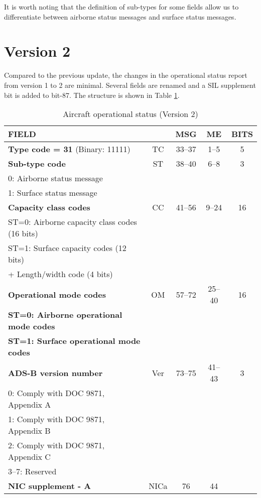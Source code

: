 It is worth noting that the definition of sub-types for some fields allow us to differentiate between airborne status messages and surface status messages.


\section{Version 2}

Compared to the previous update, the changes in the operational status report from version 1 to 2 are minimal. Several fields are renamed and a SIL supplement bit is added to bit-87. The structure is shown in Table \ref{tb:adsb-operational-status-v2}.


\begin{table}[ht]
\caption{Aircraft operational status (Version 2)}
\label{tb:adsb-operational-status-v2}
\footnotesize
\begin{tabular}{|l|c|c|c|c|}
\hline
\textbf{FIELD} &  & \textbf{MSG} & \textbf{ME} & \textbf{BITS} \\ \hline
\textbf{Type code = 31} (Binary: 11111) & TC & 33--37 & 1--5 & 5 \\ \hline
\textbf{Sub-type code} & ST & 38--40 & 6--8 & 3 \\
0: Airborne status message &&&& \\
1: Surface status message &&&& \\ \hline
\textbf{Capacity class codes} & CC & 41--56 & 9--24 & 16 \\
ST=0: Airborne capacity class codes (16 bits) &&&& \\
ST=1: Surface capacity codes (12 bits) &&&& \\
\quad\qquad+ Length/width code (4 bits) &&&& \\ \hline
\textbf{Operational mode codes} & OM & 57--72 & 25--40 & 16 \\
\textbf{ST=0: Airborne operational mode codes} &&&&\\
\textbf{ST=1: Surface operational mode codes} &&&& \\ \hline
\textbf{ADS-B version number} & Ver & 73--75 & 41--43 & 3\\ 
0: Comply with DOC 9871, Appendix A &&&&\\ 
1: Comply with DOC 9871, Appendix B &&&&\\ 
2: Comply with DOC 9871, Appendix C &&&&\\ 
3--7: Reserved &&&& \\ \hline
\textbf{NIC supplement - A} & NICa & 76 & 44 &  \\ \hline

\end{tabular}
\end{table}
